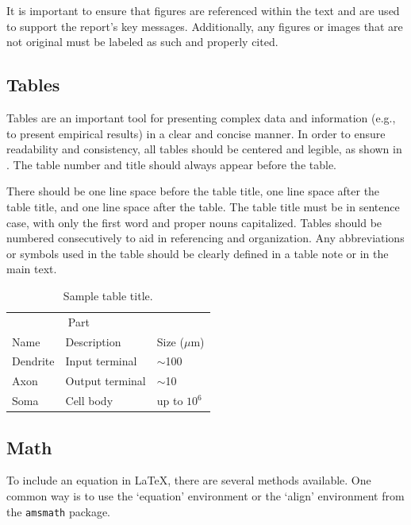 \documentclass{article}
\begin{document}
It is important to ensure that figures are referenced within the text and are used to support the report's key messages. Additionally, any figures or images that are not original must be labeled as such and properly cited.


\subsection{Tables}

Tables are an important tool for presenting complex data and information (e.g., to present empirical results) in a clear and concise manner. In order to ensure readability and consistency, all tables should be centered and legible, as shown in . The table number and title should always appear before the table.

There should be one line space before the table title, one line space after the table title, and one line space after the table. The table title must be in sentence case, with only the first word and proper nouns capitalized. Tables should be numbered consecutively to aid in referencing and organization.
%
Any abbreviations or symbols used in the table should be clearly defined in a table note or in the main text. 


\begin{table}[h]
  \caption{Sample table title.}
  \label{sample-table}
  \centering
  \begin{tabular}{lll}
    \toprule
    \multicolumn{2}{c}{Part}                   \\
    \cmidrule(r){1-2}
    Name     & Description     & Size ($\mu$m) \\
    \midrule
    Dendrite & Input terminal  & $\sim$100     \\
    Axon     & Output terminal & $\sim$10      \\
    Soma     & Cell body       & up to $10^6$  \\
    \bottomrule
  \end{tabular}
\end{table}



\subsection{Math}



To include an equation in LaTeX, there are several methods available. One common way is to use the `equation' environment or the `align' environment from the \texttt{amsmath} package.
\end{document}
